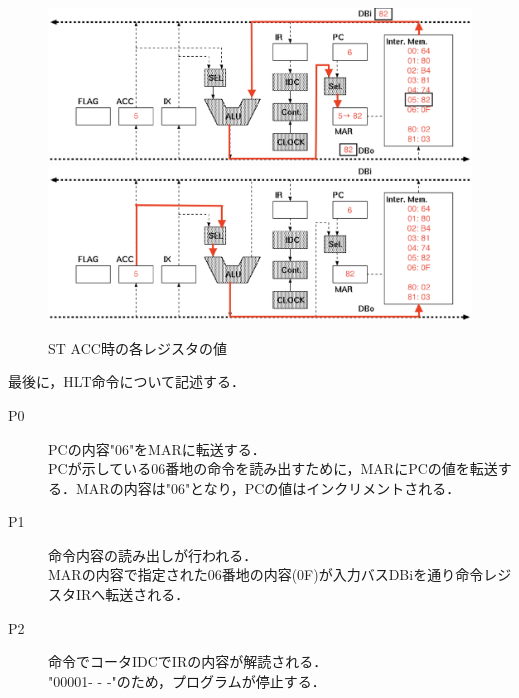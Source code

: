 \documentclass[dvipdfmx]{jsarticle}
\begin{document}
\begin{figure}[H] %
    \begin{center}
            \includegraphics[scale=0.7]{img/st3.eps}%
            \vspace{-2mm}
            \label{img:st3}
        \vspace{1cm}
            \includegraphics[scale=0.7]{img/st4.eps}%
            \vspace{-2mm}
            \label{img:st4}
    \end{center}
    \caption{ST ACC時の各レジスタの値}
    \label{st}
\end{figure}

\clearpage

最後に，HLT命令について記述する．
\begin{description}
    \item[P0] PCの内容"06"をMARに転送する． \\ PCが示している06番地の命令を読み出すために，MARにPCの値を転送する．MARの内容は"06"となり，PCの値はインクリメントされる．
    \vspace{2mm}
    \item[P1] 命令内容の読み出しが行われる． \\ MARの内容で指定された06番地の内容(0F)が入力バスDBiを通り命令レジスタIRへ転送される．
    \vspace{2mm}
    \item[P2] 命令でコータIDCでIRの内容が解読される． \\ "00001- - -"のため，プログラムが停止する．
\end{description}
\end{document}

